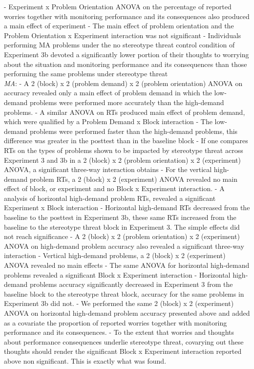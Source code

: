 \documentclass[
  doc, a4paper]{apa7}
\begin{document}
- Experiment x Problem Orientation ANOVA on the percentage of reported worries together with monitoring performance and its consequences also produced a main effect of experiment
- The main effect of problem orientation and the Problem Orientation x Experiment interaction was not significant
- Individuals performing MA problems under the no stereotype threat control condition of Experiment 3b devoted a significantly lower portion of their thoughts to worrying about the situation and monitoring performance and its consequences than those performing the same problems under stereotype threat\\
\emph{MA}:
- A 2 (block) x 2 (problem demand) x 2 (problem orientation) ANOVA on accuracy revealed only a main effect of problem demand in which the low-demand problems were performed more accurately than the high-demand problems.
- A similar ANOVA on RTs produced main effect of problem demand, which were qualified by a Problem Demand x Block interaction
- The low-demand problems were performed faster than the high-demand problems, this difference was greater in the posttest than in the baseline block
- If one compares RTs on the types of problems shown to be impacted by stereotype threat across Experiment 3 and 3b in a 2 (block) x 2 (problem orientation) x 2 (experiment) ANOVA, a significant three-way interaction obtains
- For the vertical high-demand problem RTs, a 2 (block) x 2 (experiment) ANOVA revealed no main effect of block, or experiment and no Block x Experiment interaction.
- A analysis of horizontal high-demand problem RTs, revealed a significant Experiment x Block interaction
- Horizontal high-demand RTs decreased from the baseline to the posttest in Experiment 3b, these same RTs increased from the baseline to the stereotype threat block in Experiment 3. The simple effects did not reach significance
- A 2 (block) x 2 (problem orientation) x 2 (experiment) ANOVA on high-demand problem accuracy also revealed a significant three-way interaction
- Vertical high-demand problems, a 2 (block) x 2 (experiment) ANOVA revealed no main effects
- The same ANOVA for horizontal high-demand problems revealed a significant Block x Experiment interaction
- Horizontal high-demand problems accuracy significantly decreased in Experiment 3 from the baseline block to the stereotype threat block, accuracy for the same problems in Experiment 3b did not.
- We performed the same 2 (block) x 2 (experiment) ANOVA on horizontal high-demand problem accuracy presented above and added as a covariate the proportion of reported worries together with monitoring performance and its consequences.
- To the extent that worries and thoughts about performance consequences underlie stereotype threat, covarying out these thoughts should render the significant Block x Experiment interaction reported above non significant. This is exactly what was found.
\end{document}
